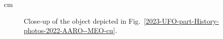  cm

%
\begin{figure}[b]
\sidecaption
%
%
\caption{Close-up of the object depicted in Fig.~\ref{2023-UFO-part-History-photos-2022-AARO--MEO-cu}.}
\label{2023-UFO-part-History-photos-2022-AARO--MEO-c}       %
\end{figure}

